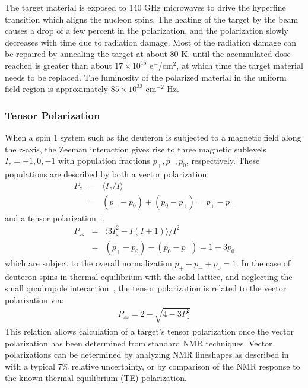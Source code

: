 The target material is exposed to 140 GHz microwaves
to drive the hyperfine transition which  aligns the nucleon spins. 
 The heating of the target by the beam causes a drop of a few percent in
the polarization, and the polarization slowly decreases with time due to radiation
damage. Most of the radiation damage can be repaired by annealing the target at
about 80 K, until the accumulated dose reached is greater than about 
$ 17\times 10^{15}$ e$^-$/cm$^2$, at
which time the target material needs to be replaced. The luminosity of the polarized 
material in the uniform field region is approximately $85\times 10^{33}$ cm$^{-2}$ Hz.

\subsubsection*{Tensor Polarization}
When a  spin 1 system such as the deuteron is subjected to a magnetic field along the z-axis, the
Zeeman interaction gives rise to three magnetic sublevels $I_z = +1,0,-1$ with
population fractions $p_+,p_-, p_0$, respectively.
These populations are described by
both a vector  polarization,
%
\begin{eqnarray}
\nonumber
P_z &=&\langle I_z/I\rangle \\ 
    &=&(p_+ - p_0) + (p_0-p_+) = p_+ - p_-
\end{eqnarray}
and a tensor polarization~\cite{Meyer:1985dta}:
\begin{eqnarray}
\nonumber
P_{zz} &=& \langle 3 I_z^2 - I(I+1)\rangle/I^2   \\
&=&(p_+ - p_0) - (p_0-p_-) = 1 - 3 p_0
\end{eqnarray}
%
which are subject to the overall normalization $p_+ + p_- + p_0 = 1$.
%
In the case of deuteron spins in thermal equilibrium with the solid lattice, and neglecting the small quadrupole interaction~\cite{Meyer:1985dta}, the tensor polarization is related to  the vector polarization via:
\begin{eqnarray}
P_{zz}= 2 - \sqrt{4-3 P_z^2}
\end{eqnarray}
This relation allows calculation of a target's tensor polarization once the vector polarization has been determined from standard NMR techniques. Vector polarizations can be determined by analyzing NMR lineshapes as described in~\cite{Dulya:1997qc} with a typical  7\% relative uncertainty, or by comparison of the NMR response to the known thermal equilibrium (TE) polarization.

